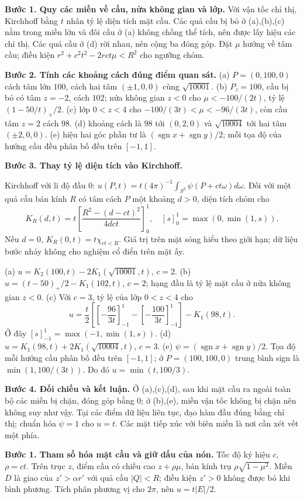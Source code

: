 \textbf{Bước 1. Quy các miền về cầu, nửa không gian và lớp.} Với vận tốc chỉ thị, Kirchhoff bằng $t$ nhân tỷ lệ diện tích mặt cầu. Các quả cầu bị bỏ ở (a),(b),(c) nằm trong miền lớn và đôi cầu ở (a) không chồng thể tích, nên được lấy hiệu các chỉ thị. Các quả cầu ở (d) rời nhau, nên cộng ba đóng góp. Đặt $\mu$ hướng về tâm cầu; điều kiện $r^2+c^2t^2-2rct\mu<R^2$ cho ngưỡng chỏm.

\textbf{Bước 2. Tính các khoảng cách đúng điểm quan sát.} (a) $P=(0,100,0)$ cách tâm lớn $100$, cách hai tâm $(\pm1,0,0)$ cùng $\sqrt{10001}$. (b) $P_z=100$, cầu bị bỏ có tâm $z=-2$, cách $102$; nửa không gian $z<0$ cho $\mu<-100/(2t)$, tỷ lệ $(1-50/t)_+/2$. (c) lớp $0<z<4$ cho $-100/(3t)<\mu<-96/(3t)$, còn cầu tâm $z=2$ cách $98$. (d) khoảng cách là $98$ tới $(0,2,0)$ và $\sqrt{10004}$ tới hai tâm $(\pm2,0,0)$. (e) hiệu hai góc phần tư là $(\operatorname{sgn}x+\operatorname{sgn}y)/2$; mỗi tọa độ của hướng cầu đều phân bố đều trên $[-1,1]$.

\textbf{Bước 3. Thay tỷ lệ diện tích vào Kirchhoff.}

Kirchhoff với li độ đầu 0: $u(P,t)=t(4\pi)^{-1}\int_{S^2}\psi(P+ct\omega)d\omega$. Đối với một quả cầu bán kính $R$ có tâm cách $P$ một khoảng $d>0$, diện tích chỏm cho
\[K_R(d,t)=t\left[\frac{R^2-(d-ct)^2}{4dct}\right]_0^1,\quad [s]_0^1=\max(0,\min(1,s)).\]
Nếu $d=0$, $K_R(0,t)=t\chi_{ct<R}$. Giá trị trên mặt sóng hiểu theo giới hạn; dữ liệu bước nhảy không cho nghiệm cổ điển trên mặt ấy.

(a) $u=K_2(100,t)-2K_1(\sqrt{10001},t)$, $c=2$.
(b) $u=(t-50)_+/2-K_1(102,t)$, $c=2$; hạng đầu là tỷ lệ mặt cầu ở nửa không gian $z<0$.
(c) Với $c=3$, tỷ lệ của lớp $0<z<4$ cho
\[u=\frac t2\left[\left[-\frac{96}{3t}\right]_{-1}^1-\left[-\frac{100}{3t}\right]_{-1}^1\right]-K_1(98,t).\]
Ở đây $[s]_{-1}^1=\max(-1,\min(1,s))$.
(d) $u=K_1(98,t)+2K_1(\sqrt{10004},t)$, $c=3$.
(e) $\psi=(\operatorname{sgn}x+\operatorname{sgn}y)/2$. Tọa độ mỗi hướng cầu phân bố đều trên $[-1,1]$; ở $P=(100,100,0)$ trung bình sign là $\min(1,100/(3t))$. Do đó $u=\min(t,100/3)$.

\textbf{Bước 4. Đối chiếu và kết luận.} Ở (a),(c),(d), sau khi mặt cầu ra ngoài toàn bộ các miền bị chặn, đóng góp bằng $0$; ở (b),(e), miền vận tốc không bị chặn nên không suy như vậy. Tại các điểm dữ liệu liên tục, đạo hàm đầu đúng bằng chỉ thị; chuẩn hóa $\psi=1$ cho $u=t$. Các mặt tiếp xúc với biên miền là nơi cần xét vết một phía.

\textbf{Bước 1. Tham số hóa mặt cầu và giữ dấu của nón.} Tốc độ ký hiệu $c$, $\rho=ct$. Trên trục $z$, điểm cầu có chiều cao $z+\rho\mu$, bán kính trụ $\rho\sqrt{1-\mu^2}$. Miền $D$ là giao của $z'>\alpha r'$ với quả cầu $|Q|<R$; điều kiện $z'>0$ không được bỏ khi bình phương. Tích phân phương vị cho $2\pi$, nên $u=t|E|/2$.

